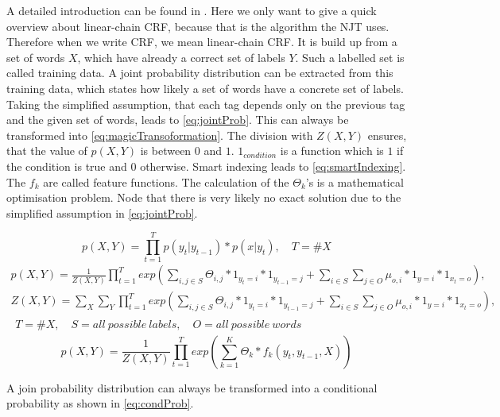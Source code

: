 \documentclass[12pt, twoside]{report}
\begin{document}
A detailed introduction can be found in \parencite{CRFIntroduction}. Here we only want to give a quick overview about linear-chain CRF, because that is the algorithm the NJT uses. Therefore when we write CRF, we mean linear-chain CRF. It is build up from a set of words $X$, which have already a correct set of labels $Y$. Such a labelled set is called training data. A joint probability distribution can be extracted from this training data, which states how likely a set of words have a concrete set of labels. Taking the simplified assumption, that each tag depends only on the previous tag and the given set of words, leads to \cref{eq:jointProb}. This can always be transformed into \cref{eq:magicTransoformation}. The division with $Z(X,Y)$ ensures, that the value of $p(X,Y)$ is between $0$ and $1$. $1_{condition}$ is a function which is $1$ if the condition is true and $0$ otherwise. Smart indexing leads to \cref{eq:smartIndexing}. The $f_k$ are called feature functions. The calculation of the $\Theta_k$'s is a mathematical optimisation problem. Node that there is very likely no exact solution due to the simplified assumption in \cref{eq:jointProb}.

\begin{equation} \label{eq:jointProb}
p(X,Y) = \prod_{t=1}^T p(y_t|y_{t-1}) * p(x|y_t), \quad T = \#X
\end{equation}
\begin{equation} \label{eq:magicTransoformation}\begin{split}
p(X,Y) = \frac{1}{Z(X,Y)}\prod_{t=1}^T exp(\sum_{i,j\in S}^{} \Theta_{i,j} * 1_{y_t=i} * 1_{y_{t-1}=j} + \sum_{i \in S}^{} \sum_{j \in O}^{} \mu_{o,i} * 1_{y=i} * 1_{x_t=o}),
\\
Z(X,Y) = \sum_{X}^{}\sum_{Y}^{}\prod_{t=1}^T exp(\sum_{i,j\in S}^{} \Theta_{i,j} * 1_{y_t=i} * 1_{y_{t-1}=j} + \sum_{i \in S}^{} \sum_{j \in O}^{} \mu_{o,i} * 1_{y=i} * 1_{x_t=o}),
\\ \begin{flalign}
T = \#X, \quad S = all\ possible\ labels, \quad O = all\ possible\ words
\end{flalign}
\end{split}\end{equation}
\begin{equation} \label{eq:smartIndexing}
p(X,Y) = \frac{1}{Z(X,Y)}\prod_{t=1}^T exp(\sum_{k=1}^{K} \Theta_{k} * f_k(y_t, y_{t-1}, X))
\end{equation}

A join probability distribution can always be transformed into a conditional probability as shown in \cref{eq:condProb}.
\end{document}
